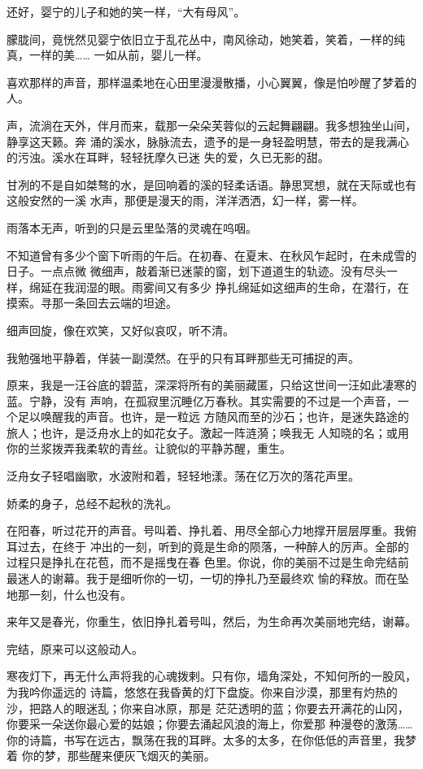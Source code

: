 \documentclass[12pt,a4paper]{article}
\begin{document}
		还好，婴宁的儿子和她的笑一样，“大有母风”。

		朦胧间，竟恍然见婴宁依旧立于乱花丛中，南风徐动，她笑着，笑着，一样的纯真，一样的美……
	一如从前，婴儿一样。

	\endwriting



		喜欢那样的声音，那样温柔地在心田里漫漫散播，小心翼翼，像是怕吵醒了梦着的人。

		声，流淌在天外，伴月而来，载那一朵朵芙蓉似的云起舞翩翩。我多想独坐山间，静享这天籁。奔
	涌的溪水，脉脉流去，遗予的是一身轻盈明慧，带去的是我满心的污浊。溪水在耳畔，轻轻抚摩久已迷
	失的爱，久已无影的甜。

		甘冽的不是自如桀骜的水，是回响着的溪的轻柔话语。静思冥想，就在天际或也有这般安然的一溪
	水声，那便是漫天的雨，洋洋洒洒，幻一样，雾一样。

		雨落本无声，听到的只是云里坠落的灵魂在呜咽。

		不知道曾有多少个窗下听雨的午后。在初春、在夏末、在秋风乍起时，在未成雪的日子。一点点微
	微细声，敲着渐已迷蒙的窗，划下道道生的轨迹。没有尽头一样，绵延在我润湿的眼。雨雾间又有多少
	挣扎绵延如这细声的生命，在潜行，在摸索。寻那一条回去云端的坦途。

		细声回旋，像在欢笑，又好似哀叹，听不清。

		我勉强地平静着，佯装一副漠然。在乎的只有耳畔那些无可捕捉的声。

		原来，我是一汪谷底的碧蓝，深深将所有的美丽藏匿，只给这世间一汪如此凄寒的蓝。宁静，没有
	声响，在孤寂里沉睡亿万春秋。其实需要的不过是一个声音，一个足以唤醒我的声音。也许，是一粒远
	方随风而至的沙石；也许，是迷失路途的旅人；也许，是泛舟水上的如花女子。激起一阵涟漪；唤我无
	人知晓的名；或用你的兰浆拨弄我柔软的青丝。让貌似的平静苏醒，重生。

		泛舟女子轻唱幽歌，水波附和着，轻轻地漾。荡在亿万次的落花声里。

		娇柔的身子，总经不起秋的洗礼。

		在阳春，听过花开的声音。号叫着、挣扎着、用尽全部心力地撑开层层厚重。我俯耳过去，在终于
	冲出的一刻，听到的竟是生命的陨落，一种醉人的厉声。全部的过程只是挣扎在花苞，而不是摇曳在春
	色里。你说，你的美丽不过是生命完结前最迷人的谢幕。我于是细听你的一切，一切的挣扎乃至最终欢
	愉的释放。而在坠地那一刻，什么也没有。

		来年又是春光，你重生，依旧挣扎着号叫，然后，为生命再次美丽地完结，谢幕。

		完结，原来可以这般动人。

		寒夜灯下，再无什么声将我的心魂拨剌。只有你，墙角深处，不知何所的一股风，为我吟你遥远的
	诗篇，悠悠在我昏黄的灯下盘旋。你来自沙漠，那里有灼热的沙，把路人的眼迷乱；你来自冰原，那是
	茫茫透明的蓝；你要去开满花的山冈，你要采一朵送你最心爱的姑娘；你要去涌起风浪的海上，你爱那
	种漫卷的激荡…… 你的诗篇，书写在远古，飘荡在我的耳畔。太多的太多，在你低低的声音里，我梦着
	你的梦，那些醒来便灰飞烟灭的美丽。
\end{document}
